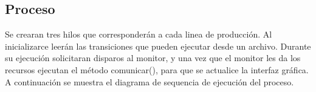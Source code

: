 \documentclass[12pt]{article} %
\begin{document}
\subsection{Proceso}
Se crearan tres hilos que corresponderán a cada linea de producción. Al inicializarce leerán las transiciones que pueden ejecutar desde un archivo. Durante su ejecución solicitaran disparos al monitor, y una vez que el monitor les da los recursos ejecutan el método comunicar(), para que se actualice la interfaz gráfica.
A continuación se muestra el diagrama de sequencia de ejecución del proceso.
\begin{figure}[H] %
\label{fig:DiagramaDeSecuencia}
\end{figure}
\end{document}
